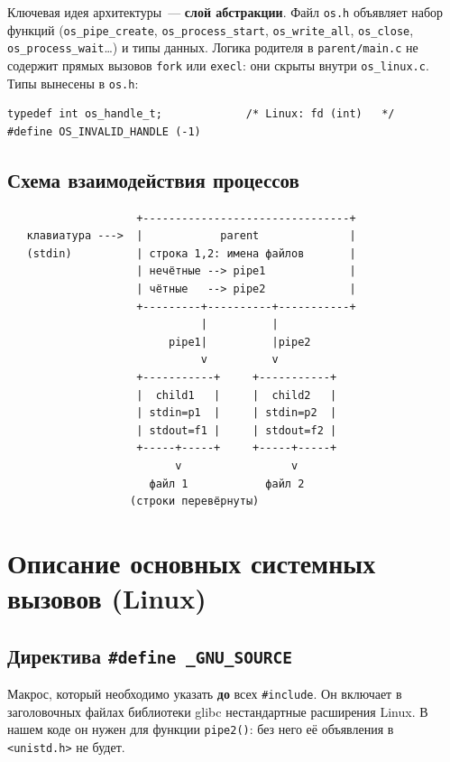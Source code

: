 \documentclass[11pt, a4paper]{article}
\begin{document}
Ключевая идея архитектуры~--- \textbf{слой абстракции}. Файл \texttt{os.h}
объявляет набор функций (\texttt{os\_\allowbreak{}pipe\_\allowbreak{}create}, \texttt{os\_\allowbreak{}process\_\allowbreak{}start},
\texttt{os\_\allowbreak{}write\_\allowbreak{}all}, \texttt{os\_\allowbreak{}close}, \texttt{os\_\allowbreak{}process\_\allowbreak{}wait}\dots) и
типы данных. Логика родителя в \texttt{parent/\allowbreak{}main.c}
не содержит прямых вызовов \texttt{fork} или \texttt{execl}: они скрыты
внутри \texttt{os\_\allowbreak{}linux.c}. Типы вынесены в \texttt{os.h}:

\begin{lstlisting}
typedef int os_handle_t;             /* Linux: fd (int)   */
#define OS_INVALID_HANDLE (-1)
\end{lstlisting}

\subsection{Схема взаимодействия процессов}

\begin{verbatim}
                    +--------------------------------+
   клавиатура --->  |            parent              |
   (stdin)          | строка 1,2: имена файлов       |
                    | нечётные --> pipe1             |
                    | чётные   --> pipe2             |
                    +---------+----------+-----------+
                              |          |
                         pipe1|          |pipe2
                              v          v
                    +-----------+     +-----------+
                    |  child1   |     |  child2   |
                    | stdin=p1  |     | stdin=p2  |
                    | stdout=f1 |     | stdout=f2 |
                    +-----+-----+     +-----+-----+
                          v                 v
                      файл 1            файл 2
                   (строки перевёрнуты)
\end{verbatim}
\section{Описание основных системных вызовов (Linux)}

\subsection{Директива \texttt{\#define \_GNU\_SOURCE}}

Макрос, который необходимо указать \textbf{до} всех \texttt{\#include}.
Он включает в заголовочных файлах библиотеки glibc нестандартные
расширения Linux. В нашем коде он нужен для функции \texttt{pipe2()}: без него её
объявления в \texttt{<unistd.h>} не будет.
\end{document}
